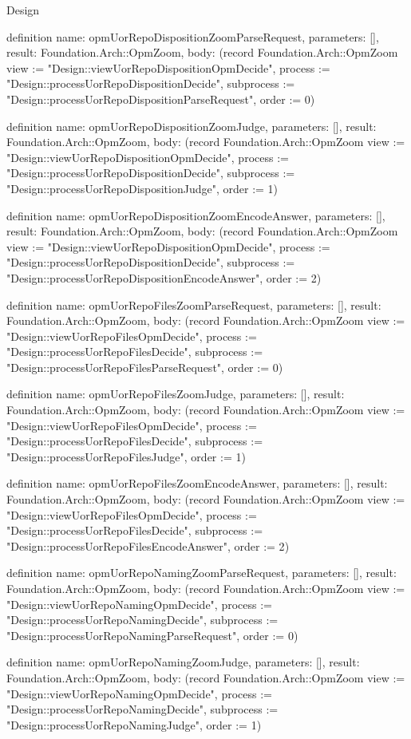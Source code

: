 \begin{lexlean}{Design}
\begin{semanticmodule}
definition{
  name: opmUorRepoDispositionZoomParseRequest,
  parameters: [],
  result: Foundation.Arch::OpmZoom,
  body: (record Foundation.Arch::OpmZoom {view := "Design::viewUorRepoDispositionOpmDecide", process := "Design::processUorRepoDispositionDecide", subprocess := "Design::processUorRepoDispositionParseRequest", order := 0})
}

definition{
  name: opmUorRepoDispositionZoomJudge,
  parameters: [],
  result: Foundation.Arch::OpmZoom,
  body: (record Foundation.Arch::OpmZoom {view := "Design::viewUorRepoDispositionOpmDecide", process := "Design::processUorRepoDispositionDecide", subprocess := "Design::processUorRepoDispositionJudge", order := 1})
}

definition{
  name: opmUorRepoDispositionZoomEncodeAnswer,
  parameters: [],
  result: Foundation.Arch::OpmZoom,
  body: (record Foundation.Arch::OpmZoom {view := "Design::viewUorRepoDispositionOpmDecide", process := "Design::processUorRepoDispositionDecide", subprocess := "Design::processUorRepoDispositionEncodeAnswer", order := 2})
}

definition{
  name: opmUorRepoFilesZoomParseRequest,
  parameters: [],
  result: Foundation.Arch::OpmZoom,
  body: (record Foundation.Arch::OpmZoom {view := "Design::viewUorRepoFilesOpmDecide", process := "Design::processUorRepoFilesDecide", subprocess := "Design::processUorRepoFilesParseRequest", order := 0})
}

definition{
  name: opmUorRepoFilesZoomJudge,
  parameters: [],
  result: Foundation.Arch::OpmZoom,
  body: (record Foundation.Arch::OpmZoom {view := "Design::viewUorRepoFilesOpmDecide", process := "Design::processUorRepoFilesDecide", subprocess := "Design::processUorRepoFilesJudge", order := 1})
}

definition{
  name: opmUorRepoFilesZoomEncodeAnswer,
  parameters: [],
  result: Foundation.Arch::OpmZoom,
  body: (record Foundation.Arch::OpmZoom {view := "Design::viewUorRepoFilesOpmDecide", process := "Design::processUorRepoFilesDecide", subprocess := "Design::processUorRepoFilesEncodeAnswer", order := 2})
}

definition{
  name: opmUorRepoNamingZoomParseRequest,
  parameters: [],
  result: Foundation.Arch::OpmZoom,
  body: (record Foundation.Arch::OpmZoom {view := "Design::viewUorRepoNamingOpmDecide", process := "Design::processUorRepoNamingDecide", subprocess := "Design::processUorRepoNamingParseRequest", order := 0})
}

definition{
  name: opmUorRepoNamingZoomJudge,
  parameters: [],
  result: Foundation.Arch::OpmZoom,
  body: (record Foundation.Arch::OpmZoom {view := "Design::viewUorRepoNamingOpmDecide", process := "Design::processUorRepoNamingDecide", subprocess := "Design::processUorRepoNamingJudge", order := 1})
}


\end{semanticmodule}
\end{lexlean}
